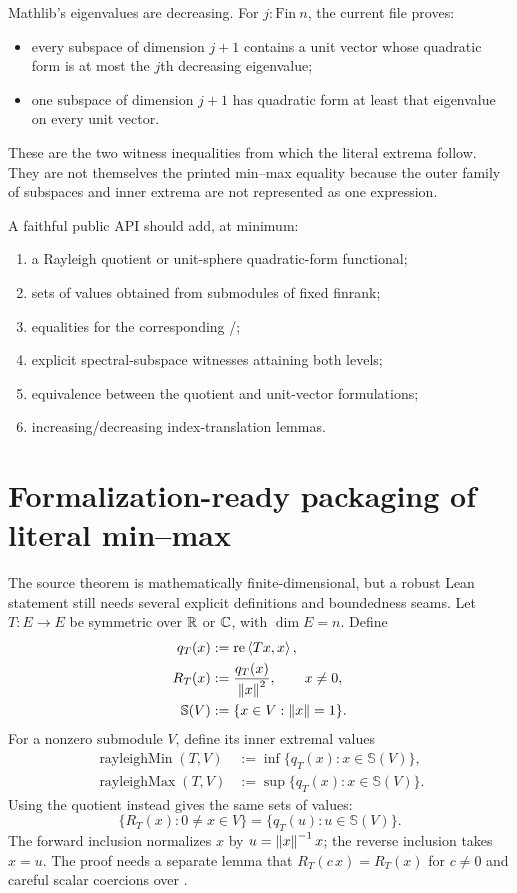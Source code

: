 Mathlib's eigenvalues are decreasing. For $j:\mathrm{Fin}\ n$, the current file proves:
\begin{itemize}[leftmargin=2em]
\item every subspace of dimension $j+1$ contains a unit vector whose quadratic form is at most the $j$th decreasing eigenvalue;
\item one subspace of dimension $j+1$ has quadratic form at least that eigenvalue on every unit vector.
\end{itemize}
These are the two witness inequalities from which the literal extrema follow. They are not themselves the printed min--max equality because the outer family of subspaces and inner extrema are not represented as one expression.

A faithful public API should add, at minimum:
\begin{enumerate}[leftmargin=2em]
\item a Rayleigh quotient or unit-sphere quadratic-form functional;
\item sets of values obtained from submodules of fixed finrank;
\item equalities for the corresponding /;
\item explicit spectral-subspace witnesses attaining both levels;
\item equivalence between the quotient and unit-vector formulations;
\item increasing/decreasing index-translation lemmas.
\end{enumerate}

\section{Formalization-ready packaging of literal min--max}

The source theorem is mathematically finite-dimensional, but a robust Lean statement still needs several explicit definitions and boundedness seams. Let $T:E\to E$ be symmetric over $\mathbb{R}$ or $\mathbb{C}$, with $\dim E=n$. Define
\begin{align*}
  q_T(x)&:=\operatorname{re}\left\langle Tx,x\right\rangle,\\
  R_T(x)&:=\frac{q_T(x)}{\left\lVert x\right\rVert^2},\qquad x\ne0,\\
  \mathbb{S}(V)&:=\{x\in V:\left\lVert x\right\rVert=1\}.
\end{align*}
For a nonzero submodule $V$, define its inner extremal values
\begin{align}
  \operatorname{rayleighMin}(T,V)
  &:=\inf\{q_T(x):x\in\mathbb{S}(V)\}, \tag{HJ-inner-min}\\
  \operatorname{rayleighMax}(T,V)
  &:=\sup\{q_T(x):x\in\mathbb{S}(V)\}. \tag{HJ-inner-max}
\end{align}
Using the quotient instead gives the same sets of values:
\begin{equation}
 \{R_T(x):0\ne x\in V\}=\{q_T(u):u\in\mathbb{S}(V)\}. \tag{HJ-unit-quotient-equiv}
\end{equation}
The forward inclusion normalizes $x$ by $u=\left\lVert x\right\rVert^{-1}x$; the reverse inclusion takes $x=u$. The proof needs a separate lemma that $R_T(c\,x)=R_T(x)$ for $c\ne0$ and careful scalar coercions over .

